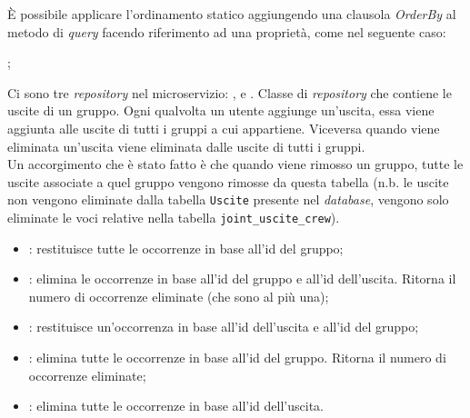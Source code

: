  \begin{center}
 \end{center}
È possibile applicare l'ordinamento statico aggiungendo una clausola \textit{OrderBy} al metodo di \textit{query} facendo riferimento ad una proprietà, come nel seguente caso:  
\begin{center}
    ;
\end{center}
Ci sono tre \textit{repository} nel \gls{microservizio}: ,  e . 
\label{JointUsciteCrewRepository}
Classe di \textit{repository} che contiene le uscite di un gruppo. Ogni qualvolta un utente aggiunge un'uscita, essa viene aggiunta alle uscite di tutti i gruppi a cui appartiene. Viceversa quando viene eliminata un'uscita viene eliminata dalle uscite di tutti i gruppi.\\
Un accorgimento che è stato fatto è che quando viene rimosso un gruppo, tutte le uscite associate a quel gruppo vengono rimosse da questa tabella (n.b. le uscite non vengono eliminate dalla tabella \texttt{Uscite} presente nel \textit{database}, vengono solo eliminate le voci relative nella tabella \texttt{joint\_uscite\_crew}).
\begin{itemize}
    \item {}: restituisce tutte le occorrenze in base all'id del gruppo;
    \item {}: elimina le occorrenze in base all'id del gruppo e all'id dell'uscita. Ritorna il numero di occorrenze eliminate (che sono al più una);
    \item {}: restituisce un'occorrenza in base all'id dell'uscita e all'id del gruppo;
    \item {}: elimina tutte le occorrenze in base all'id del gruppo. Ritorna il numero di occorrenze eliminate;
    \item {}: elimina tutte le occorrenze in base all'id dell'uscita.
\end{itemize}






